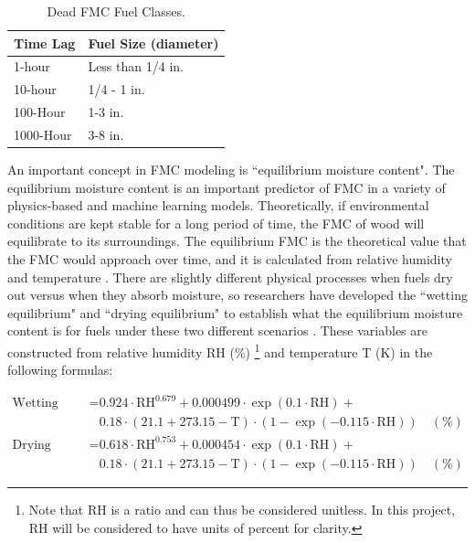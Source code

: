 \documentclass[11pt]{article}%
\begin{document}
\begin{table}[ht]
\centering
\caption{Dead FMC Fuel Classes.}
\label{tab:classes}
\begin{tabular}{|l|l|}
\hline
\textbf{Time Lag}           & \textbf{Fuel Size (diameter)} \\  \hline
1-hour     & Less than 1/4 in.             \\ \hline
10-hour    & 1/4 - 1 in.             \\ \hline
100-Hour   & 1-3 in.\\ \hline
1000-Hour   & 3-8 in.\\ \hline


\end{tabular}
\end{table}

An important concept in FMC modeling is ``equilibrium moisture content". The equilibrium moisture content is an important predictor of FMC in a variety of physics-based and machine learning models. Theoretically, if environmental conditions are kept stable for a long period of time, the FMC of wood will equilibrate to its surroundings. The equilibrium FMC is the theoretical value that the FMC would approach over time, and it is calculated from relative humidity and temperature \citep[e.g.,][]{Mitchell-2018-CEM}. There are slightly different physical processes when fuels dry out versus when they absorb moisture, so researchers have developed the ``wetting equilibrium" and ``drying equilibrium" to establish what the equilibrium moisture content is for fuels under these two different scenarios \citep{Mandel-2014-RAA}. These variables are constructed from relative humidity RH (\%) \footnote{Note that RH is a ratio and can thus be considered unitless. In this project, RH will be considered to have units of percent for clarity.} and temperature T (K) in the following formulas:


\begin{equation}
\label{eq:equil}
\begin{split}
\text{Wetting Equilibrium} = &0.924\cdot\text{RH}^{0.679} + 0.000499\cdot\exp(0.1\cdot\text{RH}) + \\ &0.18\cdot(21.1 + 273.15 - \text{T})\cdot(1 - \exp(-0.115\cdot\text{RH})) \quad (\%)\\
\text{Drying Equilibrium} = &0.618\cdot\text{RH}^{0.753} + 0.000454\cdot\exp(0.1\cdot\text{RH}) + \\ &0.18\cdot(21.1 + 273.15 - \text{T})\cdot(1 - \exp(-0.115\cdot\text{RH}))\quad (\%)
\end{split}
\end{equation}
\end{document}
